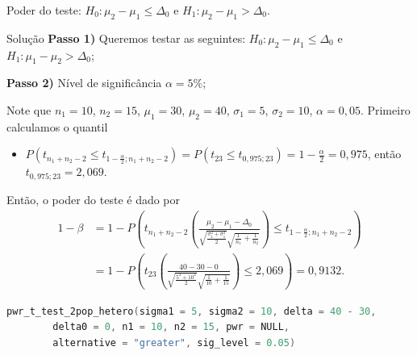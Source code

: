 \documentclass[9pt]{beamer}
\begin{document}
\begin{frame}[fragile]{Poder do teste: $H_0: \mu_2 - \mu_1 \leq \Delta_0$ e $H_1: \mu_2 - \mu_1 > \Delta_0.$}

\scriptsize
\begin{block}{Solução}
	\textbf{Passo 1)} Queremos testar as seguintes: $H_0: \mu_2 - \mu_1 \leq \Delta_0$ e $H_1: \mu_1 - \mu_2 > \Delta_0$;
	
	\textbf{Passo 2)} Nível de significância $\alpha=5\%$;
	
	Note que $n_1=10$, $n_2=15$, $\mu_1=30$, $\mu_2=40$, $\sigma_1=5$, $\sigma_2=10$, $\alpha = 0,05$. Primeiro calculamos o quantil
	\begin{itemize}
		\item $P(t_{n_1+n_2-2} \leq t_{1-\frac{\alpha}{2}; n_1+n_2-2}) = P(t_{23} \leq t_{0,975; 23}) = 1- \frac{\alpha}{2} = 0,975$, então $t_{0,975; 23} = 2,069$.
	\end{itemize}

	Então, o poder do teste é dado por
	\begin{align*}
		1- \beta &= 1 - P\left( t_{n_1 + n_2 -2}\left( \frac{ \mu_2 - \mu_1 - \Delta_0 }{\sqrt{\frac{\sigma_1^2 + \sigma_1^2}{2}} \sqrt{\frac{1}{n_1} + \frac{1}{n_2}}} \right) \leq t_{1-\frac{\alpha}{2};n_1 + n_2 -2} \right)\\
		&= 1 - P\left( t_{23}\left( \frac{ 40 - 30 - 0 }{\sqrt{\frac{5^2 + 10^2}{2}} \sqrt{\frac{1}{10} + \frac{1}{15}}} \right) \leq 2,069 \right)= 0,9132.
	\end{align*}
\end{block}

\begin{lstlisting}[language = C, caption = Código no R.]
pwr_t_test_2pop_hetero(sigma1 = 5, sigma2 = 10, delta = 40 - 30,
		delta0 = 0, n1 = 10, n2 = 15, pwr = NULL,
		alternative = "greater", sig_level = 0.05)
\end{lstlisting}

\normalsize
\end{frame}
\end{document}
